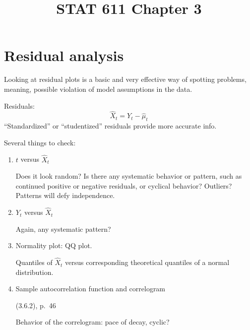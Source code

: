 \documentclass[12pt]{article}
\begin{document}
\title{STAT 611 Chapter 3}
\maketitle


\section{Residual analysis}

Looking at residual plots is a basic and very effective way of spotting
problems, meaning, possible violation of model assumptions in the data.

Residuals:
\[
\hat{X}_t = Y_t - \hat{\mu}_t
\]
``Standardized'' or ``studentized'' residuals provide more accurate
info.

Several things to check:
\begin{enumerate}
\item $t$ versus $\hat{X}_t$

    Does it look random? Is there any systematic behavior or pattern,
    such as continued positive or negative residuals, or cyclical
    behavior? Outliers?
    Patterns will defy independence.
\item $Y_t$ versus $\hat{X}_t$

    Again, any systematic pattern?
\item Normality plot: QQ plot.

    Quantiles of $\hat{X}_t$ versus
    corresponding theoretical quantiles of a normal distribution.
\item Sample autocorrelation function and correlogram

    (3.6.2), p.~46

    Behavior of the correlogram: pace of decay, cyclic?
\end{enumerate}
\end{document}
